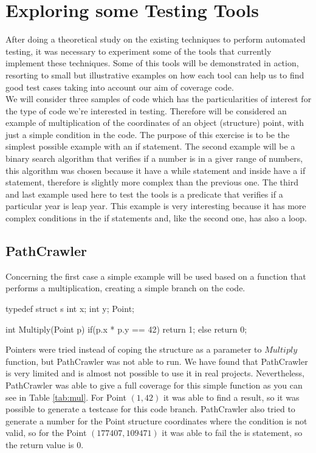 \chapter{Exploring some Testing Tools}
\minitoc

After doing a theoretical study on the existing techniques to perform automated testing, it was necessary to experiment some of the tools that currently implement these techniques.
Some of this tools will be demonstrated in action, resorting to small but illustrative examples
on how each tool can help us to find good test cases taking into account our aim of coverage code.\\
We will consider three samples of code which has the particularities of interest for the type of code we're interested in testing.
Therefore will be considered an example of multiplication of the coordinates of an object (structure) point,
with just a simple condition in the code. The purpose of this exercise is to be the simplest possible example with an if statement.
The second example will be a binary search algorithm that verifies if a number is in a giver range of numbers, this algorithm
was chosen because it have a while statement and inside have a if statement, therefore is slightly more complex than the previous one.
The third and last example used here to test the tools is a predicate that verifies if a particular year is leap year. This example
is very interesting because it has more complex conditions in the if statements and, like the second one, has also a loop.

\section{PathCrawler}
Concerning the first case a simple example will be used based on a function that performs a multiplication, creating a simple branch on the code.
\begin{code}
typedef struct s {
    int x;
    int y;
}Point;

int Multiply(Point p) {
    if(p.x * p.y == 42) return 1;
    else return 0;
}
\end{code}
Pointers were tried instead of coping the structure as a parameter to $Multiply$ function, but PathCrawler was not able to run.
We have found that PathCrawler is very limited and is almost not possible to use it in real projects.
Nevertheless, PathCrawler was able to give a full coverage for this simple function as you can see in Table \ref{tab:mul}.
For Point $(1,42)$ it was able to find a result, so it was possible to generate a testcase for this code branch.
PathCrawler also tried to generate a number for the Point structure coordinates where the condition is not valid, so for the Point $(177407,109471)$ it was able
to fail the is statement, so the return value is $0$.

